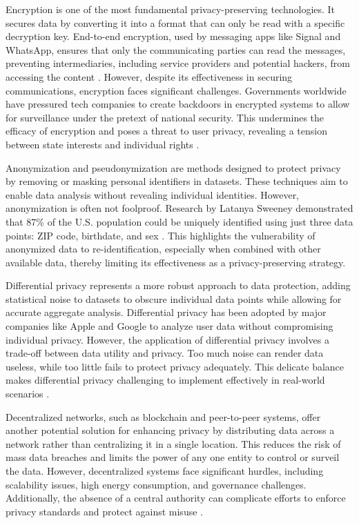 \begin{refsection}
Encryption is one of the most fundamental privacy-preserving technologies. It secures data by converting it into a format that can only be read with a specific decryption key. End-to-end encryption, used by messaging apps like Signal and WhatsApp, ensures that only the communicating parties can read the messages, preventing intermediaries, including service providers and potential hackers, from accessing the content \cite[pp.~89-91]{buchanan2020hacker}. However, despite its effectiveness in securing communications, encryption faces significant challenges. Governments worldwide have pressured tech companies to create backdoors in encrypted systems to allow for surveillance under the pretext of national security. This undermines the efficacy of encryption and poses a threat to user privacy, revealing a tension between state interests and individual rights \cite[pp.~110-113]{buchanan2020hacker}.

Anonymization and pseudonymization are methods designed to protect privacy by removing or masking personal identifiers in datasets. These techniques aim to enable data analysis without revealing individual identities. However, anonymization is often not foolproof. Research by Latanya Sweeney demonstrated that 87\% of the U.S. population could be uniquely identified using just three data points: ZIP code, birthdate, and sex \cite[pp.~1-3]{sweeney2000simple}. This highlights the vulnerability of anonymized data to re-identification, especially when combined with other available data, thereby limiting its effectiveness as a privacy-preserving strategy.

Differential privacy represents a more robust approach to data protection, adding statistical noise to datasets to obscure individual data points while allowing for accurate aggregate analysis. Differential privacy has been adopted by major companies like Apple and Google to analyze user data without compromising individual privacy. However, the application of differential privacy involves a trade-off between data utility and privacy. Too much noise can render data useless, while too little fails to protect privacy adequately. This delicate balance makes differential privacy challenging to implement effectively in real-world scenarios \cite[pp.~35-38]{dwork2014algorithmic}.

Decentralized networks, such as blockchain and peer-to-peer systems, offer another potential solution for enhancing privacy by distributing data across a network rather than centralizing it in a single location. This reduces the risk of mass data breaches and limits the power of any one entity to control or surveil the data. However, decentralized systems face significant hurdles, including scalability issues, high energy consumption, and governance challenges. Additionally, the absence of a central authority can complicate efforts to enforce privacy standards and protect against misuse \cite[pp.~85-88]{narayanan2016bitcoin}.


\end{refsection}
